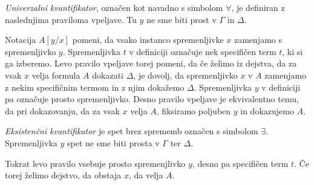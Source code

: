 \begin{definicija}
	\emph{Univerzalni kvantifikator}, označen kot navadno s simbolom $\forall$, je definiran z naslednjima praviloma vpeljave. Tu $y$ ne sme biti prost v $\Gamma$ in $\Delta$.
	\begin{center}
        \begin{bprooftree}
        \end{bprooftree}
        \begin{bprooftree}
        \end{bprooftree}
	\end{center}
	Notacija $A[y/x]$ pomeni, da vsako instanco spremenljivke $x$ zamenjamo s spremenljivko $y$. Spremenljivka $t$ v definiciji označuje nek specifičen term $t$, ki si ga izberemo. Levo pravilo vpeljave torej pomeni, da če želimo iz dejstva, da za vsak $x$ velja formula $A$ dokazati $\Delta$, je dovolj, da spremenljivko $x$ v $A$ zamenjamo z nekim specifičnim termom in z njim dokažemo $\Delta$. Spremenljivka $y$ v definiciji pa označuje prosto spremenljivko. Desno pravilo vpeljave je ekvivalentno temu, da pri dokazovanju, da za vsak $x$ velja $A$, fiksiramo poljuben $y$ in dokazujemo $A$.
\end{definicija}

\begin{definicija}
    \emph{Eksistenčni kvantifikator} je spet brez sprememb označen s simbolom $\exists$. Spremenljivka $y$ spet ne sme  biti prosta v $\Gamma$ ter $\Delta$.
    \begin{center}
        \begin{bprooftree}
        \end{bprooftree}
        \begin{bprooftree}
        \end{bprooftree}
	\end{center}
	Tokrat levo pravilo vsebuje prosto spremenjlivko $y$, desno pa specifičen term $t$. Če torej želimo dejstvo, da obstaja $x$, da velja $A$.
\end{definicija}




